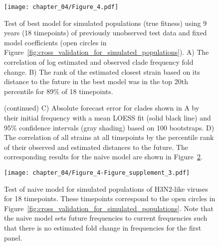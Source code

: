 \begin{figure}
  \texttt{[image: chapter\_04/Figure\_4.pdf]}
  \caption{
  Test of best model for simulated populations (true fitness) using 9 years (18 timepoints) of previously unobserved test data and fixed model coefficients (open circles in Figure~\ref{fig:cross_validation_for_simulated_populations}).
  A) The correlation of log estimated and observed clade frequency fold change.
  B) The rank of the estimated closest strain based on its distance to the future in the best model was in the top 20th percentile for 89\% of 18 timepoints.
  }
  \label{fig:test_of_best_model_for_simulated_populations}
\end{figure}

\begin{figure}\ContinuedFloat
  \caption{(continued)
   C) Absolute forecast error for clades shown in A by their initial frequency with a mean LOESS fit (solid black line) and 95\% confidence intervals (gray shading) based on 100 bootstraps.
  D) The correlation of all strains at all timepoints by the percentile rank of their observed and estimated distances to the future.
  The corresponding results for the naive model are shown in Figure~\ref{fig:test_of_naive_model_for_simulated_populations}.
  }
\end{figure}

\begin{figure}
  \texttt{[image: chapter\_04/Figure\_4-Figure\_supplement\_3.pdf]}
  \caption{
    Test of naive model for simulated populations of H3N2-like viruses for 18 timepoints.
    These timepoints correspond to the open circles in Figure~\ref{fig:cross_validation_for_simulated_populations}.
    Note that the naive model sets future frequencies to current frequencies such that there is no estimated fold change in frequencies for the first panel.
  }
  \label{fig:test_of_naive_model_for_simulated_populations}
\end{figure}

